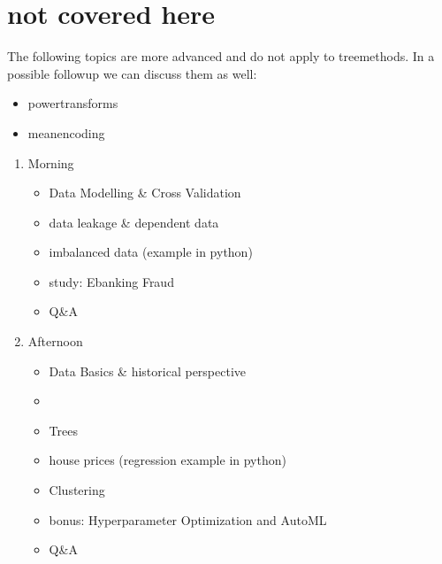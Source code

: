 \documentclass[letterpaper,10pt,english]{jupyterBook}
\begin{document}
\noindent{}


\chapter{not covered here}
\label{\detokenize{Data_Basics:not-covered-here}}
\sphinxAtStartPar
The following topics are more advanced and do not apply to tree\sphinxhyphen{}methods. In a possible follow\sphinxhyphen{}up we can discuss them as well:
\begin{itemize}
\item {} 
\sphinxAtStartPar
power\sphinxhyphen{}transforms

\item {} 
\sphinxAtStartPar
mean\sphinxhyphen{}encoding

\end{itemize}
\begin{enumerate}
%
\item {} 
\sphinxAtStartPar
Morning
\begin{itemize}
\item {} 
\sphinxAtStartPar
Data Modelling \& Cross Validation

\item {} 
\sphinxAtStartPar
data leakage \& dependent data

\item {} 
\sphinxAtStartPar
imbalanced data (example in python)

\item {} 
\sphinxAtStartPar
study: Ebanking Fraud

\item {} 
\sphinxAtStartPar
Q\&A

\end{itemize}



\item {} 
\sphinxAtStartPar
Afternoon
\begin{itemize}
\item {} 
\sphinxAtStartPar
Data Basics \& historical perspective

\item {} 
\sphinxAtStartPar
{}

\item {} 
\sphinxAtStartPar
Trees

\item {} 
\sphinxAtStartPar
house prices (regression example in python)

\item {} 
\sphinxAtStartPar
Clustering

\item {} 
\sphinxAtStartPar
bonus: Hyperparameter Optimization and AutoML

\item {} 
\sphinxAtStartPar
Q\&A

\end{itemize}

\end{enumerate}
\end{document}

